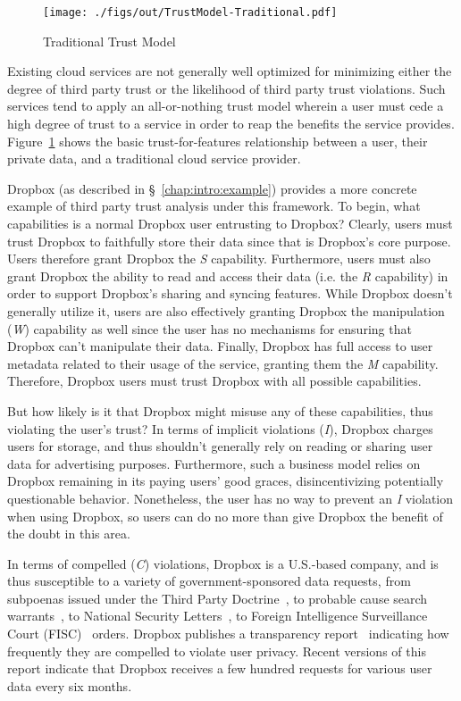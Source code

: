 \begin{figure}[t]
  \centering
  \texttt{[image: ./figs/out/TrustModel-Traditional.pdf]}
  \caption{Traditional Trust Model}
  \label{fig:trust-traditional}
\end{figure}

Existing cloud services are not generally well optimized for
minimizing either the degree of third party trust or the likelihood of
third party trust violations. Such services tend to apply an
all-or-nothing trust model wherein a user must cede a high degree of
trust to a service in order to reap the benefits the service
provides. Figure~\ref{fig:trust-traditional} shows the basic
trust-for-features relationship between a user, their private data,
and a traditional cloud service provider.

Dropbox (as described in \S~\ref{chap:intro:example}) provides a more
concrete example of third party trust analysis under this
framework. To begin, what capabilities is a normal Dropbox user
entrusting to Dropbox? Clearly, users must trust Dropbox to faithfully
store their data since that is Dropbox's core purpose. Users therefore
grant Dropbox the \emph{S} capability. Furthermore, users must also
grant Dropbox the ability to read and access their data (i.e. the
\emph{R} capability) in order to support Dropbox's sharing and syncing
features. While Dropbox doesn't generally utilize it, users are also
effectively granting Dropbox the manipulation (\emph{W}) capability as
well since the user has no mechanisms for ensuring that Dropbox can't
manipulate their data. Finally, Dropbox has full access to user
metadata related to their usage of the service, granting them the
\emph{M} capability. Therefore, Dropbox users must trust Dropbox with
all possible capabilities.

But how likely is it that Dropbox might misuse any of these
capabilities, thus violating the user's trust? In terms of implicit
violations (\emph{I}), Dropbox charges users for storage, and thus
shouldn't generally rely on reading or sharing user data for
advertising purposes. Furthermore, such a business model relies on
Dropbox remaining in its paying users' good graces, disincentivizing
potentially questionable behavior. Nonetheless, the user has no way to
prevent an \emph{I} violation when using Dropbox, so users can do no
more than give Dropbox the benefit of the doubt in this area.

In terms of compelled (\emph{C}) violations, Dropbox is a U.S.-based
company, and is thus susceptible to a variety of government-sponsored
data requests, from subpoenas issued under the Third Party
Doctrine~\cite{thompson-thirdparty}, to probable cause search
warrants~\cite{us-constitution-amend4}, to National Security
Letters~\cite{fbi-nsl}, to Foreign Intelligence Surveillance Court
(FISC)~\cite{fisc} orders. Dropbox publishes a transparency
report~\cite{dropbox-transparency} indicating how frequently they are
compelled to violate user privacy. Recent versions of this report
indicate that Dropbox receives a few hundred requests for various user
data every six months.

